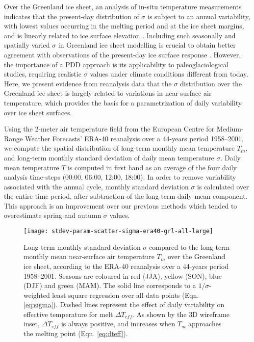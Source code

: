 \documentclass[review]{igs}
\begin{document}
Over the Greenland ice sheet, an analysis of in-situ temperature measurements indicates that the present-day distribution of $\sigma$ is subject to an annual variability, with lowest values occurring in the melting period and at the ice sheet margins, and is linearly related to ice surface elevation \citep{fausto-etal-2009,fausto-etal-2011}. Including such seasonally and spatially varied $\sigma$ in Greenland ice sheet modelling is crucial to obtain better agreement with observations of the present-day ice surface response \citep{rogozhina-rau-2014}. However, the importance of a PDD approach is its applicability to paleoglaciological studies, requiring realistic $\sigma$ values under climate conditions different from today. Here, we present evidence from reanalysis data that the $\sigma$ distribution over the Greenland ice sheet is largely related to variations in near-surface air temperature, which provides the basis for a parametrization of daily variability over ice sheet surfaces.

Using the 2-meter air temperature field from the European Centre for Medium-Range Weather Forecasts’ ERA-40 reanalysis \citep{uppala-etal-2005} over a 44-years period 1958--2001, we compute the spatial distribution of long-term monthly mean temperature $T_{m}$, and long-term monthly standard deviation of daily mean temperature $\sigma$. Daily mean temperature $T$ is computed in first hand as an average of the four daily analysis time-steps (00:00, 06:00, 12:00, 18:00). In order to remove variability associated with the annual cycle, monthly standard deviation $\sigma$ is calculated over the entire time period, after subtraction of the long-term daily mean component. This approach is an improvement over our previous methods \citep{seguinot-2013,rogozhina-rau-2014} which tended to overestimate spring and autumn $\sigma$ values.

\begin{figure*}
    \centering\texttt{[image: stdev-param-scatter-sigma-era40-grl-all-large]}
    \caption{Long-term monthly standard deviation $\sigma$ compared to the long-term monthly mean near-surface air temperature $T_{m}$ over the Greenland ice sheet, according to the ERA-40 reanalysis \citep{uppala-etal-2005} over a 44-years period 1958–2001. Seasons are coloured in red (JJA), yellow (SON), blue (DJF) and green (MAM). The solid line corresponds to a $1/\sigma$-weighted least square regression over all data points (Eqn. \ref{eq:sigma}). Dashed lines represent the effect of daily variability on effective temperature for melt $\Delta T_{eff}$. As shown by the 3D wireframe inset, $\Delta T_{eff}$ is always positive, and increases when $T_{m}$ approaches the melting point (Eqn. \ref{eq:dteff}).}
    \label{fig:grl}
\end{figure*}
\end{document}
